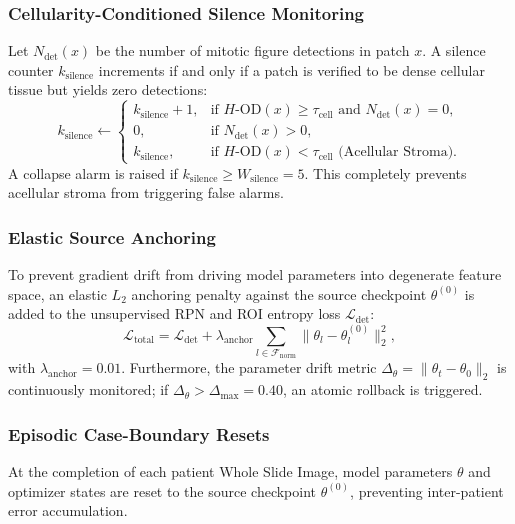 \documentclass[conference]{IEEEtran}
\begin{document}
\subsubsection{Cellularity-Conditioned Silence Monitoring}
Let $N_{\text{det}}(x)$ be the number of mitotic figure detections in patch $x$. A silence counter $k_{\text{silence}}$ increments if and only if a patch is verified to be dense cellular tissue but yields zero detections:
\begin{equation}
    k_{\text{silence}} \leftarrow 
    \begin{cases}
        k_{\text{silence}} + 1, & \text{if } H\text{-OD}(x) \ge \tau_{\text{cell}} \text{ and } N_{\text{det}}(x) = 0, \\
        0, & \text{if } N_{\text{det}}(x) > 0, \\
        k_{\text{silence}}, & \text{if } H\text{-OD}(x) < \tau_{\text{cell}} \text{ (Acellular Stroma)}.
    \end{cases}
\end{equation}
A collapse alarm is raised if $k_{\text{silence}} \ge W_{\text{silence}} = 5$. This completely prevents acellular stroma from triggering false alarms.

\subsubsection{Elastic Source Anchoring}
To prevent gradient drift from driving model parameters into degenerate feature space, an elastic $L_2$ anchoring penalty against the source checkpoint $\theta^{(0)}$ is added to the unsupervised RPN and ROI entropy loss $\mathcal{L}_{\text{det}}$:
\begin{equation}
    \mathcal{L}_{\text{total}} = \mathcal{L}_{\text{det}} + \lambda_{\text{anchor}} \sum_{l \in \mathcal{F}_{\text{norm}}} \|\theta_l - \theta_l^{(0)}\|_2^2,
\end{equation}
with $\lambda_{\text{anchor}} = 0.01$. Furthermore, the parameter drift metric $\Delta_\theta = \|\theta_t - \theta_0\|_2$ is continuously monitored; if $\Delta_\theta > \Delta_{\text{max}} = 0.40$, an atomic rollback is triggered.

\subsubsection{Episodic Case-Boundary Resets}
At the completion of each patient Whole Slide Image, model parameters $\theta$ and optimizer states are reset to the source checkpoint $\theta^{(0)}$, preventing inter-patient error accumulation.
\end{document}
